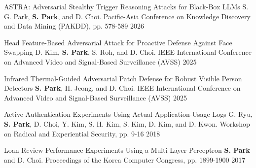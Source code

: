 \begin{cvhonors}
  \cvhonor
    {ASTRA: Adversarial Stealthy Trigger Reasoning Attacks for Black-Box LLMs}
    {S. G. Park, \textbf{S. Park}, and D. Choi. Pacific-Asia Conference on Knowledge Discovery and Data Mining (PAKDD), pp. 578-589}
    {}
    {2026}

  \cvhonor
    {Head Feature-Based Adversarial Attack for Proactive Defense Against Face Swapping}
    {D. Kim, \textbf{S. Park}, S. Roh, and D. Choi. IEEE International Conference on Advanced Video and Signal-Based Surveillance (AVSS)}
    {}
    {2025}

  \cvhonor
    {Infrared Thermal-Guided Adversarial Patch Defense for Robust Visible Person Detectors}
    {\textbf{S. Park}, H. Jeong, and D. Choi. IEEE International Conference on Advanced Video and Signal-Based Surveillance (AVSS)}
    {}
    {2025}

  \cvhonor
    {Active Authentication Experiments Using Actual Application-Usage Logs}
    {G. Ryu, \textbf{S. Park}, D. Choi, Y. Kim, S. H. Kim, S. Kim, D. Kim, and D. Kwon. Workshop on Radical and Experiential Security, pp. 9-16}
    {}
    {2018}
\end{cvhonors}


\begin{cvhonors}
  \cvhonor
    {Loan-Review Performance Experiments Using a Multi-Layer Perceptron}
    {\textbf{S. Park} and D. Choi. Proceedings of the Korea Computer Congress, pp. 1899-1900}
    {}
    {2017}
\end{cvhonors}

